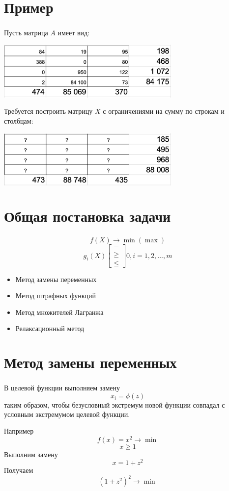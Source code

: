 \documentclass{beamer}
\begin{document}
\section{Пример}
\begin{frame}
	\frametitle{\insertsection}
	
	Пусть матрица $A$ имеет вид:
	
	\includegraphics[width=9cm]{2019-12-06_22-20-14.png}
	
	Требуется построить матрицу $X$ с ограничениями на сумму по строкам и столбцам:
	
	\includegraphics[width=9cm]{2019-12-07_12-09-38.png}
	
\end{frame}

\section{Общая постановка задачи}
\begin{frame}
	\frametitle{\insertsection}
	
	$$f(X) \to \min (\max)$$
	$$g_i(X)\begin{bmatrix} = \\ \geq \\ \leq \end{bmatrix} 0, i = 1, 2, \dots, m$$
	
    \begin{itemize}
	\item Метод замены переменных
	\item Метод штрафных функций
	\item Метод множителей Лагранжа
	\item Релаксационный метод
	\end{itemize}
	
\end{frame}

\section{Метод замены переменных}
\begin{frame}
	\frametitle{\insertsection}
	
    В целевой функции выполняем замену $$x_i = \phi(z)$$ таким образом, чтобы безусловный экстремум новой функции совпадал с условным экстремумом целевой функции.
    
    Например
    $$f(x) = x^2 \to \min$$
    $$x \geq 1$$
    Выполним замену $$x = 1 + z^2$$
    Получаем $$(1 + z^2)^2 \to \min$$
	
\end{frame}
\end{document}
